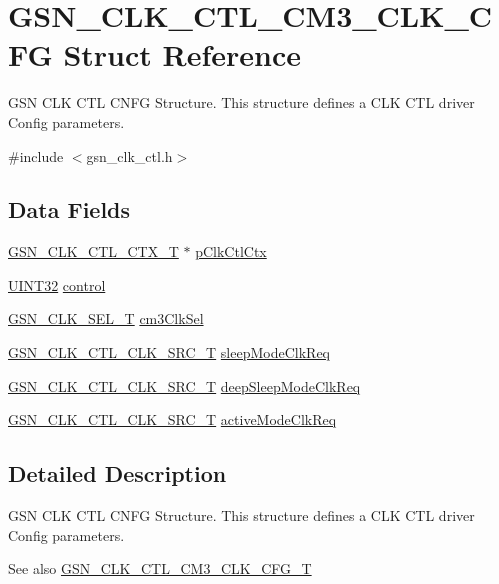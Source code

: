 \hypertarget{a00038}{
\section{GSN\_\-CLK\_\-CTL\_\-CM3\_\-CLK\_\-CFG Struct Reference}
\label{a00038}
}


GSN CLK CTL CNFG Structure. This structure defines a CLK CTL driver Config parameters.  




{\ttfamily \#include $<$gsn\_\-clk\_\-ctl.h$>$}

\subsection*{Data Fields}
\begin{DoxyCompactItemize}
\item 
\hyperlink{a00039}{GSN\_\-CLK\_\-CTL\_\-CTX\_\-T} $\ast$ \hyperlink{a00038_a21ed23d1aa476d25064b55498df83a53}{pClkCtlCtx}
\item 
\hyperlink{a00660_gae1e6edbbc26d6fbc71a90190d0266018}{UINT32} \hyperlink{a00038_aa75c95c308794f6d6bac25ed0411c606}{control}
\item 
\hyperlink{a00644_gaf4925c33b2dac850008f7d4463760580}{GSN\_\-CLK\_\-SEL\_\-T} \hyperlink{a00038_a79da36f125f774f3d906ec514f79cd23}{cm3ClkSel}
\item 
\hyperlink{a00644_ga95d23078ba56d33653b82794ca56f5d6}{GSN\_\-CLK\_\-CTL\_\-CLK\_\-SRC\_\-T} \hyperlink{a00038_a18fe4fb169866906d107cfda95ea91c4}{sleepModeClkReq}
\item 
\hyperlink{a00644_ga95d23078ba56d33653b82794ca56f5d6}{GSN\_\-CLK\_\-CTL\_\-CLK\_\-SRC\_\-T} \hyperlink{a00038_a112d6986cee5dab73487d38ba2f01fed}{deepSleepModeClkReq}
\item 
\hyperlink{a00644_ga95d23078ba56d33653b82794ca56f5d6}{GSN\_\-CLK\_\-CTL\_\-CLK\_\-SRC\_\-T} \hyperlink{a00038_a2162ae7a124223c723b0db3cc6396b82}{activeModeClkReq}
\end{DoxyCompactItemize}


\subsection{Detailed Description}
GSN CLK CTL CNFG Structure. This structure defines a CLK CTL driver Config parameters. 

\begin{DoxySeeAlso}{See also}
\hyperlink{a00644_ga8a7770f0cdba320f9d6418cc8419b450}{GSN\_\-CLK\_\-CTL\_\-CM3\_\-CLK\_\-CFG\_\-T} 
\end{DoxySeeAlso}


